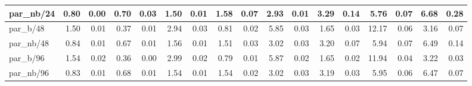 \begin{tabular}{|lllllllllllllllll|}
\multicolumn{1}{|l|}{par\_nb/24}  & \multicolumn{1}{r|}{0.80} & \multicolumn{1}{r|}{0.00} & \multicolumn{1}{r|}{0.70} & \multicolumn{1}{r|}{0.03}  & \multicolumn{1}{r|}{1.50} & \multicolumn{1}{r|}{0.01} & \multicolumn{1}{r|}{1.58} & \multicolumn{1}{r|}{0.07}  & \multicolumn{1}{r|}{2.93} & \multicolumn{1}{r|}{0.01} & \multicolumn{1}{r|}{3.29} & \multicolumn{1}{r|}{0.14}  & \multicolumn{1}{r|}{5.76} & \multicolumn{1}{r|}{0.07} & \multicolumn{1}{r|}{6.68} & \multicolumn{1}{r|}{0.28}  \\ \hline
\multicolumn{1}{|l|}{par\_b/48}  & \multicolumn{1}{r|}{1.50} & \multicolumn{1}{r|}{0.01} & \multicolumn{1}{r|}{0.37} & \multicolumn{1}{r|}{0.01}  & \multicolumn{1}{r|}{2.94} & \multicolumn{1}{r|}{0.03} & \multicolumn{1}{r|}{0.81} & \multicolumn{1}{r|}{0.02}  & \multicolumn{1}{r|}{5.85} & \multicolumn{1}{r|}{0.03} & \multicolumn{1}{r|}{1.65} & \multicolumn{1}{r|}{0.03}  & \multicolumn{1}{r|}{12.17} & \multicolumn{1}{r|}{0.06} & \multicolumn{1}{r|}{3.16} & \multicolumn{1}{r|}{0.07}  \\ \hline
\multicolumn{1}{|l|}{par\_nb/48}  & \multicolumn{1}{r|}{0.84} & \multicolumn{1}{r|}{0.01} & \multicolumn{1}{r|}{0.67} & \multicolumn{1}{r|}{0.01}  & \multicolumn{1}{r|}{1.56} & \multicolumn{1}{r|}{0.01} & \multicolumn{1}{r|}{1.51} & \multicolumn{1}{r|}{0.03}  & \multicolumn{1}{r|}{3.02} & \multicolumn{1}{r|}{0.03} & \multicolumn{1}{r|}{3.20} & \multicolumn{1}{r|}{0.07}  & \multicolumn{1}{r|}{5.94} & \multicolumn{1}{r|}{0.07} & \multicolumn{1}{r|}{6.49} & \multicolumn{1}{r|}{0.14}  \\ \hline
\multicolumn{1}{|l|}{par\_b/96}  & \multicolumn{1}{r|}{1.54} & \multicolumn{1}{r|}{0.02} & \multicolumn{1}{r|}{0.36} & \multicolumn{1}{r|}{0.00}  & \multicolumn{1}{r|}{2.99} & \multicolumn{1}{r|}{0.02} & \multicolumn{1}{r|}{0.79} & \multicolumn{1}{r|}{0.01}  & \multicolumn{1}{r|}{5.87} & \multicolumn{1}{r|}{0.02} & \multicolumn{1}{r|}{1.65} & \multicolumn{1}{r|}{0.02}  & \multicolumn{1}{r|}{11.94} & \multicolumn{1}{r|}{0.04} & \multicolumn{1}{r|}{3.22} & \multicolumn{1}{r|}{0.03}  \\ \hline
\multicolumn{1}{|l|}{par\_nb/96}  & \multicolumn{1}{r|}{0.83} & \multicolumn{1}{r|}{0.01} & \multicolumn{1}{r|}{0.68} & \multicolumn{1}{r|}{0.01}  & \multicolumn{1}{r|}{1.54} & \multicolumn{1}{r|}{0.01} & \multicolumn{1}{r|}{1.54} & \multicolumn{1}{r|}{0.02}  & \multicolumn{1}{r|}{3.02} & \multicolumn{1}{r|}{0.03} & \multicolumn{1}{r|}{3.19} & \multicolumn{1}{r|}{0.03}  & \multicolumn{1}{r|}{5.95} & \multicolumn{1}{r|}{0.06} & \multicolumn{1}{r|}{6.47} & \multicolumn{1}{r|}{0.07}  \\ \hline
\end{tabular}
